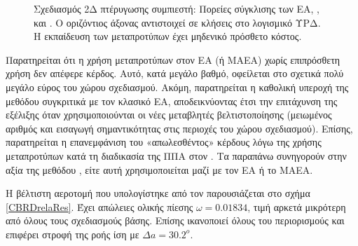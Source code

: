 \begin{figure}[h!]
\begin{minipage}[b]{1\linewidth}
 \centering
\end{minipage}
\caption{Σχεδιασμός 2Δ πτέρυγωσης συμπιεστή: Πορείες σύγκλισης των  ΕΑ, ,  και . Ο οριζόντιος άξονας αντιστοιχεί σε κλήσεις στο λογισμικό ΥΡΔ. Η εκπαίδευση των μεταπροτύπων έχει μηδενικό πρόσθετο κόστος. } 
\label{CBRDrela}
\end{figure}

Παρατηρείται ότι η χρήση μεταπροτύπων στον ΕΑ (ή ΜΑΕΑ) χωρίς επιπρόσθετη χρήση  δεν απέφερε κέρδος. Αυτό, κατά μεγάλο βαθμό, οφείλεται στο σχετικά πολύ μεγάλο εύρος του χώρου σχεδιασμού. Ακόμη, παρατηρείται η καθολική υπεροχή της μεθόδου  συγκριτικά με τον κλασικό ΕΑ, αποδεικνύοντας έτσι την επιτάχυνση της εξέλιξης όταν χρησιμοποιούνται οι νέες μεταβλητές βελτιστοποίησης (μειωμένος αριθμός και εισαγωγή σημαντικότητας στις περιοχές του χώρου σχεδιασμού). Επίσης, παρατηρείται η επανεμφάνιση του «απωλεσθέντος» κέρδους λόγω της χρήσης μεταπροτύπων κατά τη διαδικασία της ΠΠΑ στον . Τα παραπάνω συνηγορούν στην αξία της μεθόδου , είτε αυτή χρησιμοποιείται μαζί με τον ΕΑ ή το ΜΑΕΑ.            

Η βέλτιστη αεροτομή που υπολογίστηκε από τον  παρουσιάζεται στο σχήμα \ref{CBRDrelaRes}. Έχει απώλειες ολικής πίεσης $\omega=0.01834$, τιμή αρκετά μικρότερη από όλους τους σχεδιασμούς βάσης. Επίσης ικανοποιεί όλους  του περιορισμούς και επιφέρει στροφή της ροής ίση με $\Delta a = 30.2^o$. 


